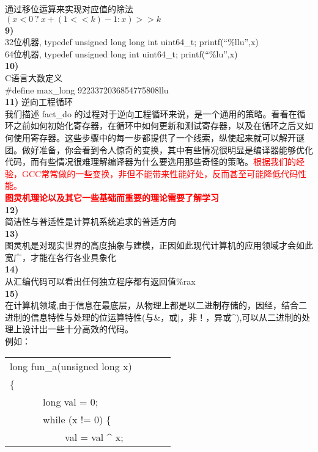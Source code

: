 \documentclass{article}
\newcommand{\red}[1]{\textcolor{red}{#1}}
\begin{document}
\begin{CJK}{UTF8}{uyhei}
通过移位运算来实现对应值的除法	\\
$(x<0\ ?\ x+(1<<k)-1 : x) >> k$	\\[1ex]
\newpage
\noindent\textbf{9)}	\\
32位机器, typedef unsigned long long int uint64\_t; printf(``\%llu'',x)	\\
64位机器, typedef unsigned long int uint64\_t; printf(``\%lu'',x)	\\
\textbf{10)}	\\
C语言大数定义	\\
\#define max\_long 9223372036854775808llu	\\
\textbf{11)}
逆向工程循环	\\
我们描述 fact\_do 的过程对于逆向工程循环来说，是一个通用的策略。看看在循环之前如何初始化寄存器，在循环中如何更新和测试寄存器，以及在循环之后又如何使用寄存器。这些步骤中的每一步都提供了一个线索，纵使起来就可以解开谜团。做好准备，你会看到令人惊奇的变换，其中有些情况很明显是编译器能够优化代码，而有些情况很难理解编译器为什么要选用那些奇怪的策略。\red{根据我们的经验，GCC常常做的一些变换，非但不能带来性能好处，反而甚至可能降低代码性能。}	\\[2ex]
\textbf{\red{ 图灵机理论以及其它一些基础而重要的理论需要了解学习 }}	\\
\textbf{12)}	\\
简洁性与普适性是计算机系统追求的普适方向	\\
\textbf{13)}	\\
图灵机是对现实世界的高度抽象与建模，正因如此现代计算机的应用领域才会如此宽广，才能在各行各业具象化	\\
\textbf{14)}	\\
从汇编代码可以看出任何独立程序都有返回值\%rax	\\[2ex]
\textbf{15)}	\\
在计算机领域,由于信息在最底层，从物理上都是以二进制存储的，因经，结合二进制的信息特性与处理的位运算特性(与\&，或$|$，非！，异或\^{}),可以从二进制的处理上设计出一些十分高效的代码。	\\
例如：	\\
\newpage	
\begin{table}[ht]
\begin{tabular}{m{2em}m{2em}m{2em}l}
	\multicolumn{3}{l}{long fun\_a(unsigned long x)}	\\
\{	\\
	&	\multicolumn{3}{l}{long val = 0;}	\\
	&	\multicolumn{3}{l}{ while (x != 0) \{ } 	\\
	&	&	\multicolumn{2}{l}{val = val \^{} x;}	\\

\end{tabular}
\end{table}
\end{CJK}
\end{document}
